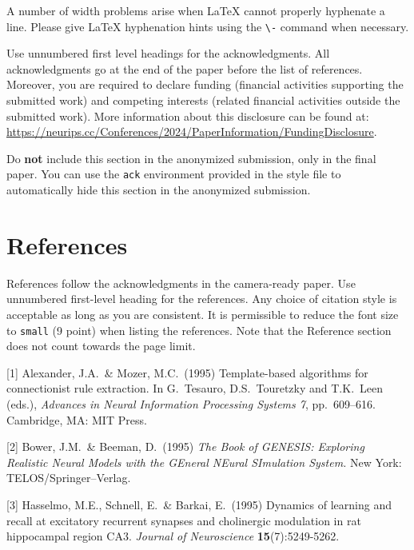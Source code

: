   
  A number of width problems arise when \LaTeX{} cannot properly hyphenate a
  line. Please give LaTeX hyphenation hints using the \verb+\-+ command when
  necessary.
  
  \begin{ack}
  Use unnumbered first level headings for the acknowledgments. All acknowledgments
  go at the end of the paper before the list of references. Moreover, you are required to declare
  funding (financial activities supporting the submitted work) and competing interests (related financial activities outside the submitted work).
  More information about this disclosure can be found at: \url{https://neurips.cc/Conferences/2024/PaperInformation/FundingDisclosure}.
  
  
  Do {\bf not} include this section in the anonymized submission, only in the final paper. You can use the \texttt{ack} environment provided in the style file to automatically hide this section in the anonymized submission.
  \end{ack}
  
  \section*{References}
  
  
  References follow the acknowledgments in the camera-ready paper. Use unnumbered first-level heading for
  the references. Any choice of citation style is acceptable as long as you are
  consistent. It is permissible to reduce the font size to \verb+small+ (9 point)
  when listing the references.
  Note that the Reference section does not count towards the page limit.
  \medskip
  
  
  {
  \small
  
  
  [1] Alexander, J.A.\ \& Mozer, M.C.\ (1995) Template-based algorithms for
  connectionist rule extraction. In G.\ Tesauro, D.S.\ Touretzky and T.K.\ Leen
  (eds.), {\it Advances in Neural Information Processing Systems 7},
  pp.\ 609--616. Cambridge, MA: MIT Press.
  
  
  [2] Bower, J.M.\ \& Beeman, D.\ (1995) {\it The Book of GENESIS: Exploring
    Realistic Neural Models with the GEneral NEural SImulation System.}  New York:
  TELOS/Springer--Verlag.
  
  
  [3] Hasselmo, M.E., Schnell, E.\ \& Barkai, E.\ (1995) Dynamics of learning and
  recall at excitatory recurrent synapses and cholinergic modulation in rat
  hippocampal region CA3. {\it Journal of Neuroscience} {\bf 15}(7):5249-5262.
  }
  
